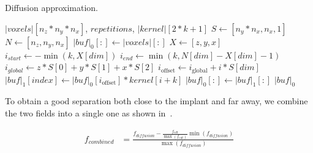 \documentclass[pdflatex,sn-mathphys]{sn-jnl}%
\theoremstyle{thmstyleone}%
\theoremstyle{thmstyletwo}%
\theoremstyle{thmstylethree}%
\begin{document}
\begin{algorithm}
    \caption{Diffusion approximation.}
    \label{alg:diffusion}
    \begin{algorithmic}
         {$|voxels|[n_z*n_y*n_x]$, $repetitions$, \newline \indent \indent $|kernel|[2*k+1]$}
            \State $S \gets [n_y * n_x, n_x, 1]$
            \State $N \gets [n_z, n_y, n_x]$
            \State $|buf|_0[:] \gets |voxels|[:]$
                        \State $X \gets [z,y,x]$
                        \State $i_{start} \gets - \min (k, X[dim])$
                        \State $i_{end} \gets \min (k, N[dim] - X[dim] - 1)$
                        \State $i_{global} \gets z*S[0] + y*S[1] + x*S[2]$
                            \State $i_\text{offset} \gets i_\text{global} + i*S[dim]$
                            \State $|buf|_1[index] \gets |buf|_0[i_\text{offset}] * kernel[i+k]$
                        \EndFor
                    \EndFor
                    \State $|buf|_0[:] \gets |buf|_1[:]$
                \EndFor
            \EndFor
            \State \Return $|buf|_0$
        \EndFunction
    \end{algorithmic}
\end{algorithm}

To obtain a good separation both close to the implant and far away, we combine the two fields into a
single one as shown in~.

%

\begin{equation}
    \label{eq:field-comb}
    \begin{split}
        f_{combined} &= \frac{f_{diffusion} - \frac{f_{edt}}{\max (f_{edt})} \min (f_{diffusion})}{\max (f_{diffusion})}
    \end{split}
\end{equation}
\end{document}
